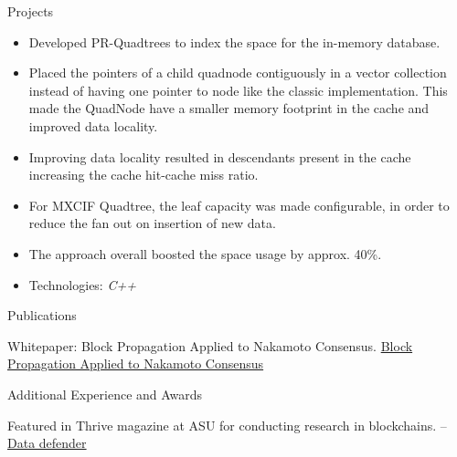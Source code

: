 \documentclass[]{mcdowellcv}
\begin{document}
    \begin{cvsection}{Projects}
        \begin{cvsubsection}{}{}{}
            \begin{cvsubsectionitem}
            \item {}
                \begin{itemize}
                    \item Developed PR-Quadtrees to index the space for the in-memory database.
                    \item Placed the pointers of a child quadnode contiguously in a vector collection instead of having
                        one pointer to node like the classic implementation. This made the QuadNode have a smaller
                        memory footprint in the cache and improved data locality.
                    \item Improving data locality resulted in descendants present in the cache increasing the cache
                        hit-cache miss ratio. 
                    \item For MXCIF Quadtree, the leaf capacity was made configurable, in order to reduce the fan out on
                        insertion of new data. 
                    \item  The approach overall boosted the space usage by approx. 40\%.
                    \item Technologies: \emph{C++}
                \end{itemize}
            \end{cvsubsectionitem}
        \end{cvsubsection}
    \end{cvsection}

    \begin{cvsection}{Publications}
        \begin{cvsubsection}{}{}{}
            \begin{cvsubsectionitem}
            \item Whitepaper: Block Propagation Applied to Nakamoto Consensus.
                \href{https://blockchain.asu.edu/block-propagation-applied-to-nakamoto-networks} {Block Propagation
                Applied to Nakamoto Consensus}
            \end{cvsubsectionitem}
        \end{cvsubsection}
    \end{cvsection}

    \begin{cvsection}{Additional Experience and Awards}
        \begin{cvsubsection}{}{}{}
            \begin{cvsubsectionitem}
            \item Featured in Thrive magazine at ASU for conducting research in blockchains. -- \href{https://asunow.asu.edu/20180327-solutions-asu-engineers-data-defenders}{Data defender}
            \end{cvsubsectionitem}
        \end{cvsubsection}
    \end{cvsection}
\end{document}
